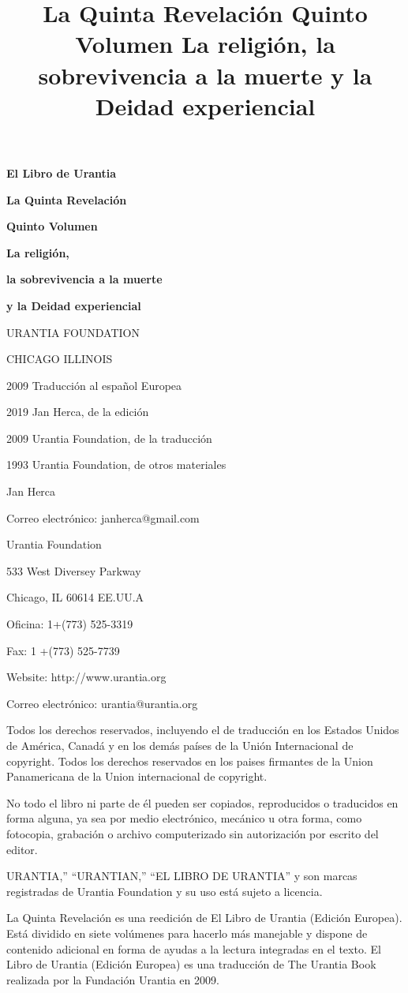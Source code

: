 \documentclass[twoside, 11pt]{book}
\title{La Quinta Revelación \newline Quinto Volumen \newline La religión, la sobrevivencia a la muerte y la Deidad experiencial}
\date{}
\begin{document}
	
\begin{titlepage}
	\centering
	{\Huge\bfseries El Libro de Urantia\par}
	{\huge\bfseries La Quinta Revelación\par}
	\vspace{1cm}
	{\huge\bfseries Quinto Volumen\par}
	\vspace{1cm}
	{\huge\bfseries La religión,\par}
	{\huge\bfseries la sobrevivencia a la muerte\par}
	{\huge\bfseries y la Deidad experiencial\par}
	\vfill
	{\scshape\Large URANTIA FOUNDATION\par}
	{\scshape\Large CHICAGO ILLINOIS\par}
	{\Large 2009 Traducción al español Europea\par}
\end{titlepage}
	
	
\par {\textcopyright} 2019 Jan Herca, de la edición
\par {\textcopyright} 2009 Urantia Foundation, de la traducción
\par {\textcopyright} 1993 Urantia Foundation, de otros materiales
\bigbreak
\par Jan Herca
\par Correo electrónico: janherca@gmail.com
\bigbreak
\par Urantia Foundation
\par 533 West Diversey Parkway
\par Chicago, IL 60614 EE.UU.A
\par Oficina: 1+(773) 525-3319
\par Fax: 1 +(773) 525-7739
\par Website: http://www.urantia.org
\par Correo electrónico: urantia@urantia.org
\bigbreak
\par Todos los derechos reservados, incluyendo el de traducción en los Estados Unidos de América, Canadá y en los demás países de la Unión Internacional de copyright. Todos los derechos reservados en los paises firmantes de la Union Panamericana de la Union internacional de copyright.
\par No todo el libro ni parte de él pueden ser copiados, reproducidos o traducidos en forma alguna, ya sea por medio electrónico, mecánico u otra forma, como fotocopia, grabación o archivo computerizado sin autorización por escrito del editor.
\par URANTIA,'' ``URANTIAN,'' ``EL LIBRO DE URANTIA'' y son marcas registradas de Urantia Foundation y su uso está sujeto a licencia.
\bigbreak
\par La Quinta Revelación es una reedición de El Libro de Urantia (Edición Europea). Está dividido en siete volúmenes para hacerlo más manejable y dispone de contenido adicional en forma de ayudas a la lectura integradas en el texto. El Libro de Urantia (Edición Europea) es una traducción de The Urantia Book realizada por la Fundación Urantia en 2009. 
\newpage
\end{document}
